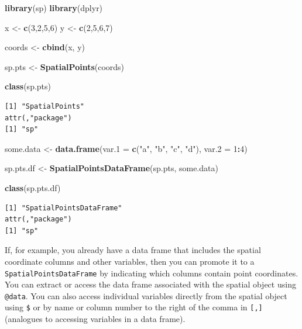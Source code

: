 \documentclass[
]{krantz}
\makeatletter
\newenvironment{Shaded}{\begin{snugshade}}{\end{snugshade}}
\newcommand{\DataTypeTok}[1]{\textcolor[rgb]{0.27,0.27,0.27}{#1}}
\newcommand{\DecValTok}[1]{\textcolor[rgb]{0.06,0.06,0.06}{#1}}
\newcommand{\KeywordTok}[1]{\textcolor[rgb]{0.27,0.27,0.27}{\textbf{#1}}}
\newcommand{\NormalTok}[1]{#1}
\newcommand{\OperatorTok}[1]{\textcolor[rgb]{0.43,0.43,0.43}{\textbf{#1}}}
\newcommand{\StringTok}[1]{\textcolor[rgb]{0.5,0.5,0.5}{#1}}
\newenvironment{kframe}{%
\medskip{}
\setlength{\fboxsep}{.8em}
 \def\at@end@of@kframe{}%
 \ifinner\ifhmode%
  \def\at@end@of@kframe{\end{minipage}}%
  \begin{minipage}{\columnwidth}%
 \fi\fi%
 \def\FrameCommand##1{\hskip\@totalleftmargin \hskip-\fboxsep
 \colorbox{shadecolor}{##1}\hskip-\fboxsep
     \hskip-\linewidth \hskip-\@totalleftmargin \hskip\columnwidth}%
 \MakeFramed {\advance\hsize-\width
   \@totalleftmargin\z@ \linewidth\hsize
   \@setminipage}}%
 {\par\unskip\endMakeFramed%
 \at@end@of@kframe}
\renewenvironment{Shaded}{\begin{kframe}}{\end{kframe}}
\makeatother
\begin{document}
\begin{Shaded}
\begin{Highlighting}[]
\KeywordTok{library}\NormalTok{(sp)}
\KeywordTok{library}\NormalTok{(dplyr)}

\NormalTok{x \textless{}{-}}\StringTok{ }\KeywordTok{c}\NormalTok{(}\DecValTok{3}\NormalTok{,}\DecValTok{2}\NormalTok{,}\DecValTok{5}\NormalTok{,}\DecValTok{6}\NormalTok{)}
\NormalTok{y \textless{}{-}}\StringTok{ }\KeywordTok{c}\NormalTok{(}\DecValTok{2}\NormalTok{,}\DecValTok{5}\NormalTok{,}\DecValTok{6}\NormalTok{,}\DecValTok{7}\NormalTok{)}

\NormalTok{coords \textless{}{-}}\StringTok{ }\KeywordTok{cbind}\NormalTok{(x, y)}

\NormalTok{sp.pts \textless{}{-}}\StringTok{ }\KeywordTok{SpatialPoints}\NormalTok{(coords)}

\KeywordTok{class}\NormalTok{(sp.pts)}
\end{Highlighting}
\end{Shaded}

\begin{verbatim}
[1] "SpatialPoints"
attr(,"package")
[1] "sp"
\end{verbatim}

\begin{Shaded}
\begin{Highlighting}[]
\NormalTok{some.data \textless{}{-}}\StringTok{ }\KeywordTok{data.frame}\NormalTok{(}\DataTypeTok{var.1 =} \KeywordTok{c}\NormalTok{(}\StringTok{"a"}\NormalTok{, }\StringTok{"b"}\NormalTok{, }\StringTok{"c"}\NormalTok{, }\StringTok{"d"}\NormalTok{), }\DataTypeTok{var.2 =} \DecValTok{1}\OperatorTok{:}\DecValTok{4}\NormalTok{)}

\NormalTok{sp.pts.df \textless{}{-}}\StringTok{ }\KeywordTok{SpatialPointsDataFrame}\NormalTok{(sp.pts, some.data)}

\KeywordTok{class}\NormalTok{(sp.pts.df)}
\end{Highlighting}
\end{Shaded}

\begin{verbatim}
[1] "SpatialPointsDataFrame"
attr(,"package")
[1] "sp"
\end{verbatim}

If, for example, you already have a data frame that includes the spatial coordinate columns and other variables, then you can promote it to a \texttt{SpatialPointsDataFrame} by indicating which columns contain point coordinates. You can extract or access the data frame associated with the spatial object using \texttt{@data}. You can also access individual variables directly from the spatial object using \texttt{\$} or by name or column number to the right of the comma in \texttt{{[},{]}} (analogues to accessing variables in a data frame).
\end{document}
